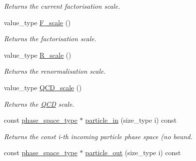 \begin{DoxyCompactItemize}
\begin{DoxyCompactList}\small\item\em Returns the current factorisation scale. \end{DoxyCompactList}\item 
\hypertarget{a00210_abe64f2b5afc4b8a008a586fbb438d9c7}{value\-\_\-type \hyperlink{a00210_abe64f2b5afc4b8a008a586fbb438d9c7}{F\-\_\-scale} ()}\label{a00210_abe64f2b5afc4b8a008a586fbb438d9c7}

\begin{DoxyCompactList}\small\item\em Returns the factorisation scale. \end{DoxyCompactList}\item 
\hypertarget{a00210_a8da9cf12c0989e5cdab88598b22e25bd}{value\-\_\-type \hyperlink{a00210_a8da9cf12c0989e5cdab88598b22e25bd}{R\-\_\-scale} ()}\label{a00210_a8da9cf12c0989e5cdab88598b22e25bd}

\begin{DoxyCompactList}\small\item\em Returns the renormalisation scale. \end{DoxyCompactList}\item 
\hypertarget{a00210_a6ad3a46d7ebd0b31999c367c406bdb74}{value\-\_\-type \hyperlink{a00210_a6ad3a46d7ebd0b31999c367c406bdb74}{Q\-C\-D\-\_\-scale} ()}\label{a00210_a6ad3a46d7ebd0b31999c367c406bdb74}

\begin{DoxyCompactList}\small\item\em Returns the \hyperlink{a00449}{Q\-C\-D} scale. \end{DoxyCompactList}\item 
\hypertarget{a00210_a2a6c913c456f562a3e464cd89553993f}{const \hyperlink{a00400}{phase\-\_\-space\-\_\-type} $\ast$ \hyperlink{a00210_a2a6c913c456f562a3e464cd89553993f}{particle\-\_\-in} (size\-\_\-type i) const }\label{a00210_a2a6c913c456f562a3e464cd89553993f}

\begin{DoxyCompactList}\small\item\em Returns the const i-\/th incoming particle phase space (no bound. \end{DoxyCompactList}\item 
\hypertarget{a00210_af775cf485839e207d09aa4fcfefac37b}{const \hyperlink{a00400}{phase\-\_\-space\-\_\-type} $\ast$ \hyperlink{a00210_af775cf485839e207d09aa4fcfefac37b}{particle\-\_\-out} (size\-\_\-type i) const }\label{a00210_af775cf485839e207d09aa4fcfefac37b}


\end{DoxyCompactItemize}
